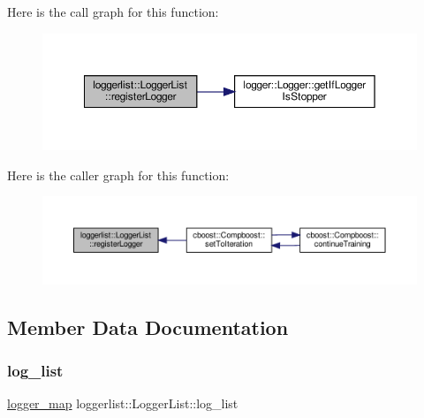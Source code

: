 Here is the call graph for this function\+:\nopagebreak
\begin{figure}[H]
\begin{center}
\leavevmode
\includegraphics[width=350pt]{classloggerlist_1_1_logger_list_a883c2526c3e56e572df670f64b966d41_cgraph}
\end{center}
\end{figure}
Here is the caller graph for this function\+:\nopagebreak
\begin{figure}[H]
\begin{center}
\leavevmode
\includegraphics[width=350pt]{classloggerlist_1_1_logger_list_a883c2526c3e56e572df670f64b966d41_icgraph}
\end{center}
\end{figure}


\subsection{Member Data Documentation}
\mbox{\label{classloggerlist_1_1_logger_list_a56997d07c587921a70b0b2c6538ce1f0}} 
\subsubsection{\texorpdfstring{log\+\_\+list}{log\_list}}
{\footnotesize\ttfamily \hyperlink{loggerlist_8h_afa233b5ec9ffbe76605d913e86d40fe6}{logger\+\_\+map} loggerlist\+::\+Logger\+List\+::log\+\_\+list\hspace{0.3cm}{\ttfamily [private]}}

\mbox{\label{classloggerlist_1_1_logger_list_a39c3b4cf8f01c0e29606a9b2537da347}} 
